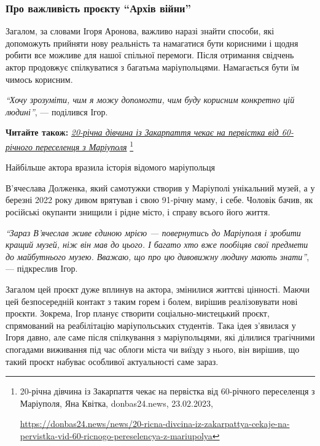 \subsubsection{Про важливість проєкту \enquote{Архів війни}}

Загалом, за словами Ігоря Аронова, важливо наразі знайти способи, які
допоможуть прийняти нову реальність та намагатися бути корисними і щодня робити
все можливе для нашої спільної перемоги. Після отримання свідчень актор
продовжує спілкуватися з багатьма маріупольцями. Намагається бути їм чимось
корисним.

\begin{leftbar}
\emph{\enquote{Хочу зрозуміти, чим я можу допомогти, чим буду корисним конкретно цій людині}}, — поділився Ігор.
\end{leftbar}

\textbf{Читайте також:} \href{https://donbas24.news/news/20-ricna-divcina-iz-zakarpattya-cekaje-na-pervistka-vid-60-ricnogo-pereselencya-z-mariupolya}{\emph{20-річна дівчина із Закарпаття чекає на первістка від 60-річного переселенця з Маріуполя}}%
\footnote{20-річна дівчина із Закарпаття чекає на первістка від 60-річного переселенця з Маріуполя, Яна Квітка, donbas24.news, 23.02.2023, \par%
\url{https://donbas24.news/news/20-ricna-divcina-iz-zakarpattya-cekaje-na-pervistka-vid-60-ricnogo-pereselencya-z-mariupolya}%
}


Найбільше актора вразила історія відомого маріупольця\par\noindent В'ячеслава Долженка, який
самотужки створив у Маріуполі унікальний музей, а у березні 2022 року дивом
врятував і свою 91-річну маму, і себе. Чоловік бачив, як російські окупанти
знищили і рідне місто, і справу всього його життя.

\begin{leftbar}
\emph{\enquote{Зараз В'ячеслав живе єдиною мрією — повернутись до Маріуполя і зробити
кращий музей, ніж він мав до цього. І багато хто вже пообіцяв свої предмети до
майбутнього музею. Вважаю, що про цю дивовижну людину мають знати}}, —
підкреслив Ігор. 
\end{leftbar}

Загалом цей проєкт дуже вплинув на актора, змінилися життєві цінності. Маючи
цей безпосередній контакт з таким горем і болем, вирішив реалізовувати нові
проєкти. Зокрема, Ігор планує створити соціально-мистецький проєкт, спрямований
на реабілітацію маріупольських студентів. Така ідея з'явилася у Ігоря давно,
але саме після спілкування з маріупольцями, які ділилися трагічними спогадами
виживання під час облоги міста чи виїзду з нього, він вирішив, що такий проєкт
набуває особливої актуальності саме зараз.

